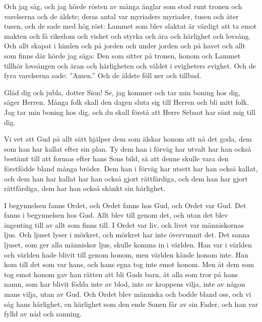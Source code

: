 {Och jag såg, och jag hörde rösten av många änglar som stod runt tronen och varelserna och de äldste; deras antal var myriaders myriader, tusen och åter tusen,
och de sade med hög röst: Lammet som blev slaktat är värdigt att ta emot makten och få rikedom och vishet och styrka och ära och härlighet och lovsång.
Och allt skapat i himlen och på jorden och under jorden och på havet och allt som finns där hörde jag säga: Den som sitter på tronen, honom och Lammet tillhör lovsången och äran och härligheten och väldet i evigheters evighet.
Och de fyra varelserna sade: ”Amen.” Och de äldste föll ner och tillbad.}


{
Gläd dig och jubla, dotter Sion!
Se, jag kommer
och tar min boning hos dig,
säger Herren.
Många folk skall den dagen
sluta sig till Herren och bli mitt folk.
Jag tar min boning hos dig, och du skall förstå att Herre Sebaot har sänt mig till dig.}

{
Vi vet att Gud på allt sätt hjälper dem som älskar honom att nå det goda, dem som han har kallat efter sin plan.
Ty dem han i förväg har utvalt har han också bestämt till att formas efter hans Sons bild, så att denne skulle vara den förstfödde bland många bröder.
Dem han i förväg har utsett har han också kallat, och dem han har kallat har han också gjort rättfärdiga, och dem han har gjort rättfärdiga, dem har han också skänkt sin härlighet.}




{
I begynnelsen fanns Ordet, och Ordet fanns hos Gud, och Ordet var Gud.
Det fanns i begynnelsen hos Gud.
Allt blev till genom det, och utan det blev ingenting till av allt som finns till.
I Ordet var liv, och livet var människornas ljus.
Och ljuset lyser i mörkret, och mörkret har inte övervunnit det.
Det sanna ljuset, som ger alla människor ljus, skulle komma in i världen.
Han var i världen och världen hade blivit till genom honom, men världen kände honom inte.
Han kom till det som var hans, och hans egna tog inte emot honom.
Men åt dem som tog emot honom gav han rätten att bli Guds barn, åt alla som tror på hans namn,
som har blivit födda inte av blod, inte av kroppens vilja, inte av någon mans vilja, utan av Gud.
Och Ordet blev människa och bodde bland oss, och vi såg hans härlighet, en härlighet som den ende Sonen får av sin Fader, och han var fylld av nåd och sanning.}


